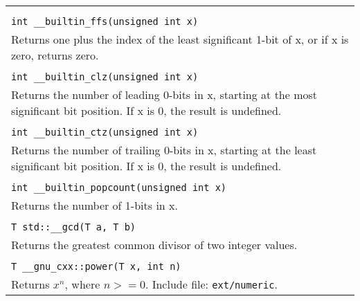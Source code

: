 \documentclass[10pt,a4paper,twocolumn]{article}
\newenvironment{fpar}
	{
		\nopagebreak
		\begin{tabular}{|l|}
		\hline\begin{minipage}{277pt}
		\vspace{0.5em}
	}
	{
		\vspace{0.5em}
		\end{minipage}\\
		\hline\end{tabular}
		\nopagebreak
	}
\begin{document}
\begin{fpar}
{\bf GCC hacks}

You can append l or ll for long and long long variants.\\
\\
\verb+int __builtin_ffs(unsigned int x)+\\
Returns one plus the index of the least significant 1-bit of x, or if x is
zero, returns zero.\\
\\
\verb+int __builtin_clz(unsigned int x)+\\
Returns the number of leading 0-bits in x, starting at the most significant bit
position. If x is 0, the result is undefined.\\
\\
\verb+int __builtin_ctz(unsigned int x)+\\
Returns the number of trailing 0-bits in x, starting at the least significant
bit position. If x is 0, the result is undefined.\\
\\
\verb+int __builtin_popcount(unsigned int x)+\\
Returns the number of 1-bits in x.\\
\\
\verb+T std::__gcd(T a, T b)+\\
Returns the greatest common divisor of two integer values.\\
\\
\verb+T __gnu_cxx::power(T x, int n)+\\
Returns $x^n$, where $n >= 0$. Include file: \verb+ext/numeric+.
\end{fpar}
\end{document}
